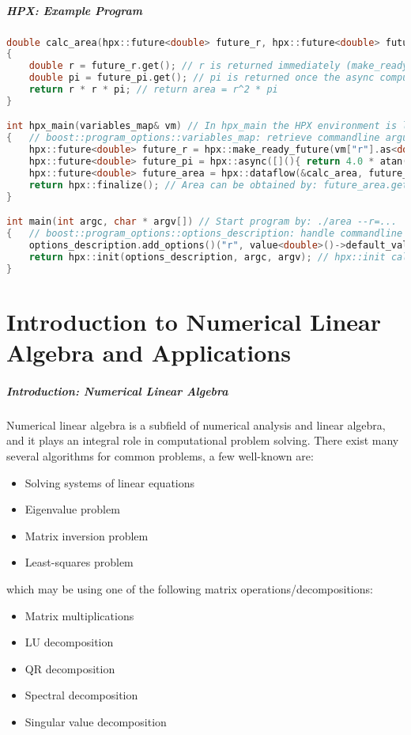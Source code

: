 \begin{frame}[fragile]
\frametitle{HPX: Example Program}
\begin{lstlisting}[language=C++]
double calc_area(hpx::future<double> future_r, hpx::future<double> future_pi)
{
    double r = future_r.get(); // r is returned immediately (make_ready_future)
    double pi = future_pi.get(); // pi is returned once the async computation finishes
    return r * r * pi; // return area = r^2 * pi
}

int hpx_main(variables_map& vm) // In hpx_main the HPX environment is loaded
{   // boost::program_options::variables_map: retrieve commandline arguments
    hpx::future<double> future_r = hpx::make_ready_future(vm["r"].as<double>());
    hpx::future<double> future_pi = hpx::async([](){ return 4.0 * atan(1.0); });
    hpx::future<double> future_area = hpx::dataflow(&calc_area, future_r, future_pi);
    return hpx::finalize(); // Area can be obtained by: future_area.get()
}

int main(int argc, char * argv[]) // Start program by: ./area --r=...
{   // boost::program_options::options_description: handle commandline arguments
    options_description.add_options()("r", value<double>()->default_value(1.0), "Radius: r");
    return hpx::init(options_description, argc, argv); // hpx::init calls hpx_main
}
\end{lstlisting}
\end{frame}

\part{Introduction to Numerical Linear Algebra and Applications}
\makepart

\begin{frame}
\frametitle{Introduction: Numerical Linear Algebra}
Numerical linear algebra is a subfield of numerical analysis and linear algebra,
and it plays an integral role in computational problem solving.
There exist many several algorithms for common problems, a few well-known are:
\begin{itemize}
 \item Solving systems of linear equations
 \item Eigenvalue problem
 \item Matrix inversion problem
 \item Least-squares problem
\end{itemize}
which may be using one of the following matrix operations/decompositions:
\begin{itemize}
 \item Matrix multiplications
 \item LU decomposition
 \item QR decomposition
 \item Spectral decomposition
 \item Singular value decomposition
\end{itemize}
\end{frame}

